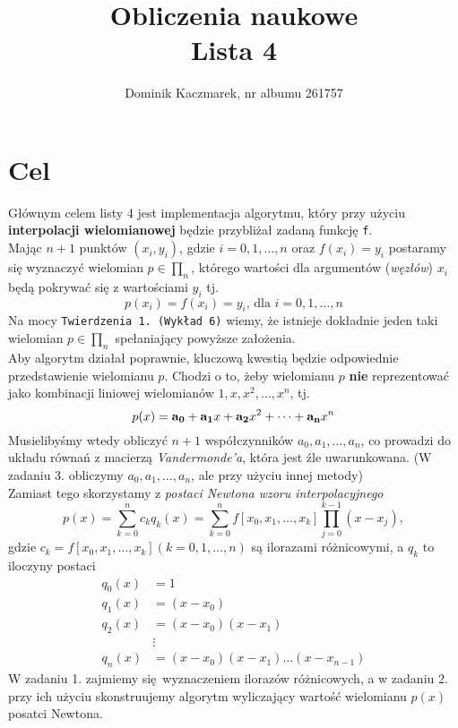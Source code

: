 \documentclass[a4paper]{article}
\title{Obliczenia naukowe\\Lista 4}
\author{Dominik Kaczmarek, nr albumu 261757}
\begin{document}
\maketitle
\tableofcontents
{} 
\newpage

\section{Cel}
    Głównym celem listy 4 jest implementacja algorytmu, który przy użyciu \textbf{interpolacji wielomianowej} będzie przybliżał zadaną funkcję \texttt{f}. \\ 
    Mając $n+1$ punktów $(x_i, y_i)$, gdzie $i = 0,1,\dots,n$ oraz $f(x_i) = y_i$ postaramy się wyznaczyć wielomian $p \in \prod_n$, którego wartości dla argumentów (\emph{węzłów}) $x_i$ będą pokrywać się z wartościami $y_i$ tj.
    \[p(x_i) = f(x_i) = y_i \text{, dla } i = 0,1,\dots,n\]
    Na mocy \texttt{Twierdzenia 1. (Wykład 6)} wiemy, że istnieje dokładnie jeden taki wielomian $p \in \prod_n$ spełaniający powyższe założenia.\\
    Aby algorytm działał poprawnie, kluczową kwestią będzie odpowiednie przedstawienie wielomianu $p$. Chodzi o to, żeby wielomianu $p$ \textbf{nie} reprezentować jako kombinacji liniowej  wielomianów $1, x, x^2, \dots, x^n $, tj. 
    \[ p(x) = \bold{a_0} + \bold{a_1}x + \bold{a_2}x^2 + \dots + \bold{a_n}x^n \]
    Musielibyśmy wtedy obliczyć $n+1$ współczynników $a_0, a_1, \dots, a_n$, co prowadzi do układu równań z macierzą \emph{Vandermonde'a}, która jest źle uwarunkowana. (W zadaniu 3. obliczymy $a_0, a_1, \dots, a_n$, ale przy użyciu innej metody)\\
    Zamiast tego skorzystamy z \emph{postaci Newtona wzoru interpolacyjnego}
    \[ p(x) = \sum_{k=0}^n c_kq_k(x) = \sum_{k=0}^n f[x_0,x_1,\dots,x_k] \prod_{j=0}^{k-1} (x - x_j),\]
    gdzie $c_k = f[x_0,x_1,\dots,x_k] (k=0,1,\dots,n)$ są ilorazami różnicowymi, a $q_k$ to iloczyny postaci 
    \begin{align*}
        q_0(x) &= 1 \\
        q_1(x) &= (x - x_0) \\
        q_2(x) &= (x - x_0)(x - x_1) \\
               &\vdots \\
        q_n(x) &= (x - x_0)(x - x_1)\dots(x - x_{n-1})
    \end{align*}
    W zadaniu 1. zajmiemy się wyznaczeniem ilorazów różnicowych, a w zadaniu 2. przy ich użyciu skonstruujemy algorytm wyliczający wartość wielomianu $p(x)$ posatci Newtona. 
\end{document}
